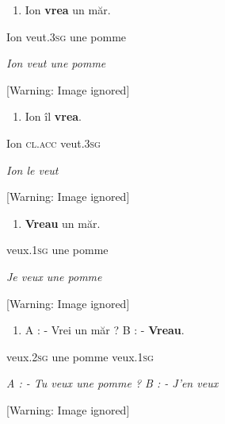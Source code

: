 \begin{enumerate}
\item \label{bkm:Ref299440983}Ion  \textbf{vrea}  un  măr.


\end{enumerate}
  Ion  veut\textsc{.3sg}  une  pomme

{\itshape
  Ion veut une pomme}

  [Warning: Image ignored] %
 


\begin{enumerate}
\item \label{bkm:Ref299441053}Ion  îl  \textbf{vrea}.


\end{enumerate}
  Ion \textsc{cl.acc}  veut\textsc{.3sg} 

{\itshape
  Ion le veut}

  [Warning: Image ignored] %
 


\begin{enumerate}
\item \label{bkm:Ref299441141}\textbf{Vreau}  un  măr.


\end{enumerate}
  veux\textsc{.1sg}  une  pomme

{\itshape
  Je veux une pomme}

  [Warning: Image ignored] %
 


\begin{enumerate}
\item \label{bkm:Ref299441213}A : - Vrei  un  măr ?  B : - \textbf{Vreau}.


\end{enumerate}
    veux\textsc{.2sg}  une  pomme    veux\textsc{.1sg}

{\itshape
  A : - Tu veux une pomme ?  B : - J'en veux}

  [Warning: Image ignored] %
 


